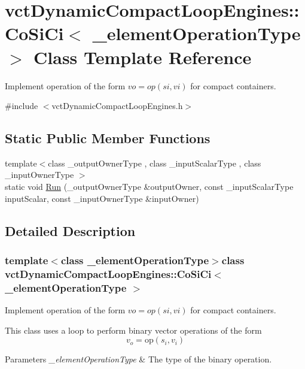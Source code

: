 \hypertarget{classvct_dynamic_compact_loop_engines_1_1_co_si_ci}{\section{vct\-Dynamic\-Compact\-Loop\-Engines\-:\-:Co\-Si\-Ci$<$ \-\_\-element\-Operation\-Type $>$ Class Template Reference}
\label{classvct_dynamic_compact_loop_engines_1_1_co_si_ci}
}


Implement operation of the form $vo = op(si, vi)$ for compact containers.  




{\ttfamily \#include $<$vct\-Dynamic\-Compact\-Loop\-Engines.\-h$>$}

\subsection*{Static Public Member Functions}
\begin{DoxyCompactItemize}
\item 
{\footnotesize template$<$class \-\_\-output\-Owner\-Type , class \-\_\-input\-Scalar\-Type , class \-\_\-input\-Owner\-Type $>$ }\\static void \hyperlink{classvct_dynamic_compact_loop_engines_1_1_co_si_ci_a37cb9bf2d0b699b35d29373750e20a44}{Run} (\-\_\-output\-Owner\-Type \&output\-Owner, const \-\_\-input\-Scalar\-Type input\-Scalar, const \-\_\-input\-Owner\-Type \&input\-Owner)
\end{DoxyCompactItemize}


\subsection{Detailed Description}
\subsubsection*{template$<$class \-\_\-element\-Operation\-Type$>$class vct\-Dynamic\-Compact\-Loop\-Engines\-::\-Co\-Si\-Ci$<$ \-\_\-element\-Operation\-Type $>$}

Implement operation of the form $vo = op(si, vi)$ for compact containers. 

This class uses a loop to perform binary vector operations of the form \[ v_o = \mathrm{op}(s_i, v_i) \]


\begin{DoxyParams}{Parameters}
{\em \-\_\-element\-Operation\-Type} & The type of the binary operation. \\
\hline
\end{DoxyParams}


